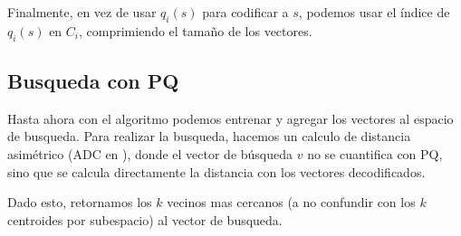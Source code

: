 \newpage

Finalmente, en vez de usar \(q_i(s)\) para codificar a \(s\), podemos usar el 
\'indice de \(q_i(s)\) en \(C_i\), comprimiendo el tama\~no de los vectores.

\subsection{Busqueda con PQ}

Hasta ahora con el algoritmo podemos entrenar y agregar los vectores al espacio 
de busqueda. 
Para realizar la busqueda, hacemos un calculo de distancia asim\'etrico 
(ADC en \cite{pqnns}), donde el vector de b\'usqueda \(v\) no se cuantifica con 
PQ, sino que se calcula directamente la distancia con los vectores 
decodificados.

Dado esto, retornamos los \(k\) vecinos mas cercanos (a no confundir con los 
\(k\) centroides por subespacio) al vector de busqueda. 

